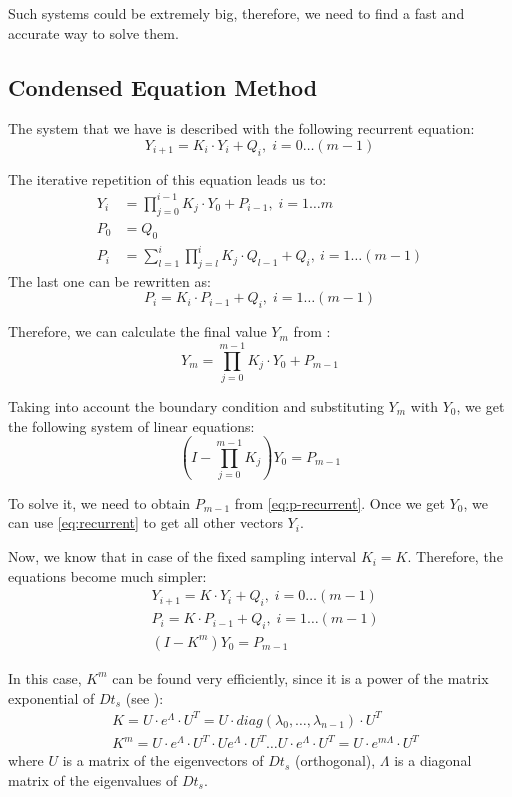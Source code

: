 Such systems could be extremely big, therefore, we need to find a fast and accurate way to solve them.

\subsection{Condensed Equation Method}
The system that we have is described with the following recurrent equation:
\begin{equation} \label{eq:recurrent}
  Y_{i + 1} = K_i \cdot Y_i + Q_i, \; i = 0 \dots (m - 1)
\end{equation}

The iterative repetition of this equation leads us to:
\begin{align}
  Y_i & = \prod_{j = 0}^{i - 1} K_j \cdot Y_0 + P_{i - 1}, \; i = 1 \dots m \label{eq:y-recurrent} \\
  P_0 & = Q_0 \nonumber \\
  P_i & = \sum_{l = 1}^i \prod_{j = l}^i K_j \cdot Q_{l - 1} + Q_i, \: i = 1 \dots (m - 1) \nonumber
\end{align}
The last one can be rewritten as:
\begin{equation} \label{eq:p-recurrent}
  P_i = K_i \cdot P_{i - 1} + Q_i, \; i = 1 \dots (m - 1)
\end{equation}

Therefore, we can calculate the final value $Y_m$ from :
\[
  Y_m = \prod_{j = 0}^{m - 1} K_j \cdot Y_0 + P_{m - 1}
\]

Taking into account the boundary condition  and substituting $Y_m$ with $Y_0$, we get the following system of linear equations:
\[
  (I - \prod_{j = 0}^{m - 1} K_j) Y_0 = P_{m - 1}
\]

To solve it, we need to obtain $P_{m - 1}$ from \eqref{eq:p-recurrent}. Once we get $Y_0$, we can use \eqref{eq:recurrent} to get all other vectors $Y_i$.

Now, we know that in case of the fixed sampling interval $K_i = K$. Therefore, the equations become much simpler:
\begin{align}
  & Y_{i + 1} = K \cdot Y_i + Q_i, \; i = 0 \dots (m - 1) \nonumber \\
  & P_i = K \cdot P_{i - 1} + Q_i, \; i = 1 \dots (m - 1) \nonumber \\
  & (I - K^m) Y_0 = P_{m - 1} \label{eq:linear-system}
\end{align}

In this case, $K^m$ can be found very efficiently, since it is a power of the matrix exponential of $D t_s$ (see ):
\begin{align*}
  & K = U \cdot e^{\Lambda} \cdot U^T = U \cdot diag(\lambda_0, \dots, \lambda_{n - 1}) \cdot U^T \\
  & K^m = U \cdot e^{\Lambda} \cdot U^T \cdot U e^{\Lambda} \cdot U^T \dots U \cdot e^{\Lambda} \cdot U^T = U \cdot e^{m \Lambda} \cdot U^T
\end{align*}
where $U$ is a matrix of the eigenvectors of $D t_s$ (orthogonal), $\Lambda$ is a diagonal matrix of the eigenvalues of $D t_s$.

